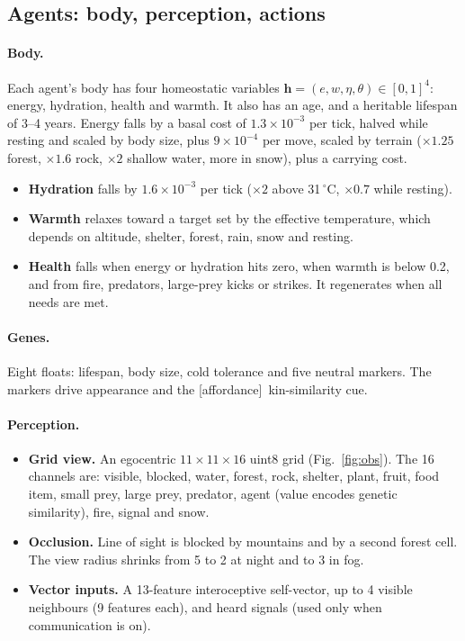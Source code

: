 \documentclass[10pt]{article}
\newcommand{\aff}[1]{\textsf{\small[affordance]}~#1}
\begin{document}
\subsection{Agents: body, perception, actions}
\paragraph{Body.}
Each agent's body has four homeostatic variables $\bm h=(e,w,\eta,\theta)\in[0,1]^4$: energy, hydration, health and
warmth. It also has an age, and a heritable lifespan of 3--4 years. Energy falls by a basal cost of $1.3\times10^{-3}$
per tick, halved while resting and scaled by body size, plus $9\times10^{-4}$ per move, scaled by terrain
($\times1.25$ forest, $\times1.6$ rock, $\times2$ shallow water, more in snow), plus a carrying cost.
\begin{itemize}
\item \textbf{Hydration} falls by $1.6\times10^{-3}$ per tick ($\times2$ above 31\,$^\circ$C, $\times0.7$ while
resting).
\item \textbf{Warmth} relaxes toward a target set by the effective temperature, which depends on altitude, shelter,
forest, rain, snow and resting.
\item \textbf{Health} falls when energy or hydration hits zero, when warmth is below 0.2, and from fire, predators,
large-prey kicks or strikes. It regenerates when all needs are met.
\end{itemize}

\paragraph{Genes.}
Eight floats: lifespan, body size, cold tolerance and five neutral markers. The markers drive appearance and the
\aff{kin-similarity} cue.

\paragraph{Perception.}
\begin{itemize}
\item \textbf{Grid view.} An egocentric $11\times11\times16$ uint8 grid (Fig.~\ref{fig:obs}). The 16 channels are:
visible, blocked, water, forest, rock, shelter, plant, fruit, food item, small prey, large prey, predator, agent
(value encodes genetic similarity), fire, signal and snow.
\item \textbf{Occlusion.} Line of sight is blocked by mountains and by a second forest cell. The view radius shrinks
from 5 to 2 at night and to 3 in fog.
\item \textbf{Vector inputs.} A 13-feature interoceptive self-vector, up to 4 visible neighbours (9 features each),
and heard signals (used only when communication is on).
\end{itemize}
\end{document}
